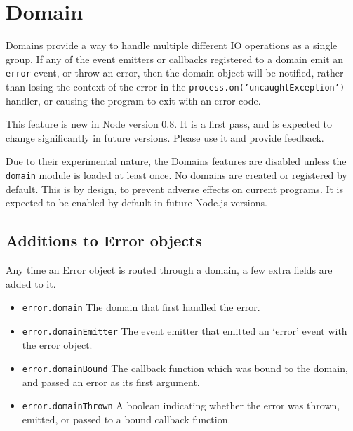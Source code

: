 \section{Domain}

\begin{Shaded}
\begin{Highlighting}[]
\NormalTok{: } 
\end{Highlighting}
\end{Shaded}

Domains provide a way to handle multiple different IO operations as a
single group. If any of the event emitters or callbacks registered to a
domain emit an \texttt{error} event, or throw an error, then the domain
object will be notified, rather than losing the context of the error in
the \texttt{process.on('uncaughtException')} handler, or causing the
program to exit with an error code.

This feature is new in Node version 0.8. It is a first pass, and is
expected to change significantly in future versions. Please use it and
provide feedback.

Due to their experimental nature, the Domains features are disabled
unless the \texttt{domain} module is loaded at least once. No domains
are created or registered by default. This is by design, to prevent
adverse effects on current programs. It is expected to be enabled by
default in future Node.js versions.

\subsection{Additions to Error objects}

Any time an Error object is routed through a domain, a few extra fields
are added to it.

\begin{itemize}
\item
  \texttt{error.domain} The domain that first handled the error.
\item
  \texttt{error.domainEmitter} The event emitter that emitted an `error'
  event with the error object.
\item
  \texttt{error.domainBound} The callback function which was bound to
  the domain, and passed an error as its first argument.
\item
  \texttt{error.domainThrown} A boolean indicating whether the error was
  thrown, emitted, or passed to a bound callback function.
\end{itemize}

